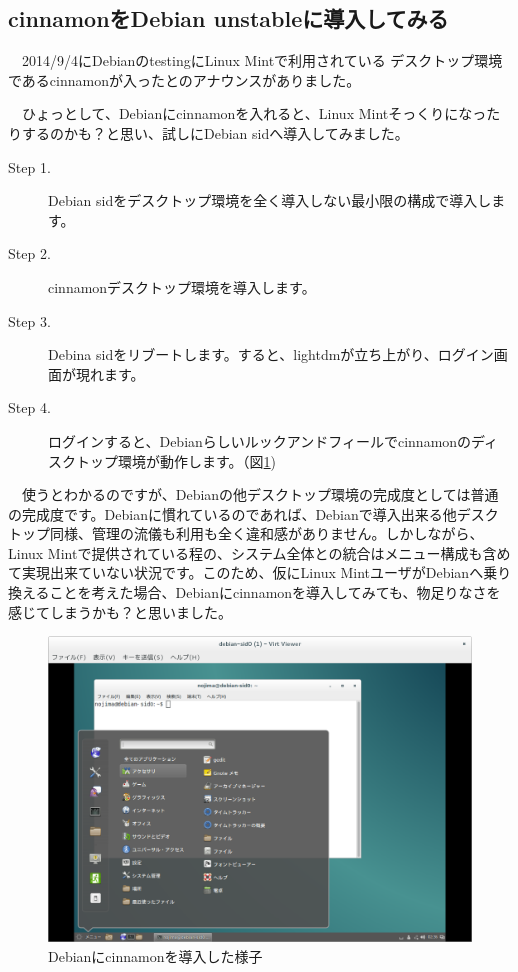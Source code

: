 \documentclass[mingoth,a4paper]{jsarticle}
\begin{document}
\subsection{cinnamonをDebian unstableに導入してみる}

　2014/9/4にDebianのtestingにLinux Mintで利用されている
デスクトップ環境であるcinnamonが入ったとのアナウンスがありました。

　ひょっとして、Debianにcinnamonを入れると、Linux Mintそっくりになったりするのかも？と思い、試しにDebian sidへ導入してみました。

\begin{description}
\item [Step 1.] Debian sidをデスクトップ環境を全く導入しない最小限の構成で導入します。
\item [Step 2.] cinnamonデスクトップ環境を導入します。
\item [Step 3.] Debina sidをリブートします。すると、lightdmが立ち上がり、ログイン画面が現れます。
\item [Step 4.] ログインすると、Debianらしいルックアンドフィールでcinnamonのディスクトップ環境が動作します。（図\ref{fig:debian-cinnamon})
\end{description}

　使うとわかるのですが、Debianの他デスクトップ環境の完成度としては普通の完成度です。Debianに慣れているのであれば、Debianで導入出来る他デスクトップ同様、管理の流儀も利用も全く違和感がありません。しかしながら、Linux Mintで提供されている程の、システム全体との統合はメニュー構成も含めて実現出来ていない状況です。このため、仮にLinux MintユーザがDebianへ乗り換えることを考えた場合、Debianにcinnamonを導入してみても、物足りなさを感じてしまうかも？と思いました。

\begin{figure}[H]
\centering
\includegraphics[width=0.6\hsize]{image201412/debian-cinnamon.png}  
\caption{Debianにcinnamonを導入した様子}\label{fig:debian-cinnamon}
\end{figure} 
\end{document}

